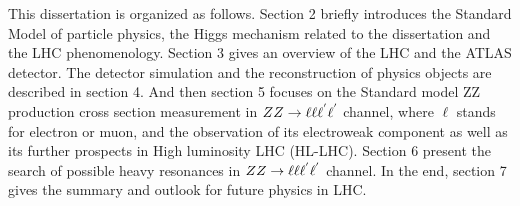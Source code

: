 This dissertation is organized as follows. 
Section 2 briefly introduces the Standard Model of particle physics, the Higgs mechanism related to the dissertation and the LHC phenomenology. 
Section 3 gives an overview of the LHC and the ATLAS detector. 
The detector simulation and the reconstruction of physics objects are described in section 4. 
And then section 5 focuses on the Standard model ZZ production cross section measurement in $ZZ \rightarrow \ell\ell\ell^{'}\ell^{'}$ channel, where $\mathrm{\ell}$ stands for electron or muon, 
and the observation of its electroweak component as well as its further prospects in High luminosity LHC (HL-LHC). 
Section 6 present the search of possible heavy resonances in $ZZ \rightarrow \ell\ell\ell^{'}\ell^{'}$ channel. 
In the end, section 7 gives the summary and outlook for future physics in LHC.
